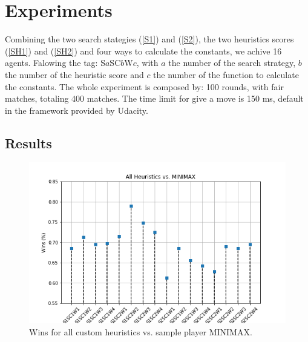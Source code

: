 \documentclass[a4paper]{article}
\begin{document}
\section{Experiments}

Combining the two search stategies (\ref{S1}) and (\ref{S2}), the two heuristics scores (\ref{SH1}) and (\ref{SH2}) and four ways to calculate the constants, we achive 16 agents. Falowing the tag: S$a$SC$b$W$c$, with $a$ the number of the search strategy, $b$ the number of the heuristic score and $c$ the number of the function to calculate the constants. The whole experiment is composed by: 100 rounds, with fair matches, totaling 400 matches. The time limit for give a move is 150 ms, default in the framework provided by Udacity.

\subsection{Results}

\begin{figure}[htpb]
\begin{center}
\includegraphics[width=1\columnwidth]{fig/results_Wins_All_vs_MINIMAX.png}
\caption{Wins for all custom heuristics vs. sample player MINIMAX.}
\end{center}
\label{figwinsMINIMAX}
\end{figure}
    
\end{document}
